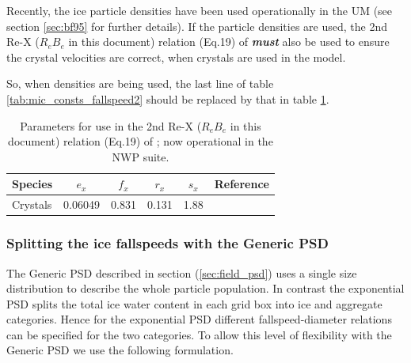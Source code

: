 \documentclass{UMDP_article}
\begin{document}
Recently, the \cite{Brown:Francis:1995} ice particle densities have been 
used operationally in the UM (see section \ref{sec:bf95} for further details). 
If the
\cite{Brown:Francis:1995} particle densities are used, the 2nd Re-X 
($R_e$\-$B_e$ in this document) relation (Eq.19) of \cite{Mitchell:1996}
\textit{\textbf{must}} also be used
to ensure the crystal velocities are correct, when crystals are used in the model.

So, when \cite{Brown:Francis:1995} densities are being used, the
last line of table \ref{tab:mic_consts_fallspeed2} should be replaced by
that in table \ref{tab:mit_2nd_rex}.

\begin{table}[ht!]
\begin{center}
\begin{tabular}{lccccl}
\hline
Species   & {$e_x$} & {$f_x$} & {$r_x$} & {$s_x$} & Reference       \\
\hline
Crystals  &  0.06049 &  0.831  & 0.131   & 1.88   &\cite{Mitchell:1996}\\
\hline
\end{tabular}
\end{center}
\caption{\label{tab:mit_2nd_rex} Parameters for use in the 2nd Re-X 
($R_e$\-$B_e$ in this document) relation (Eq.19) of \cite{Mitchell:1996}; 
now operational in the NWP suite.}
\end{table} 


\subsubsection{Splitting the ice fallspeeds with the Generic PSD}
\label{sec:split_ice_vt}

The Generic PSD described in section (\ref{sec:field_psd}) uses
a single size distribution to describe the whole particle
population. In contrast the exponential PSD splits the total
ice water content in each grid box into ice and aggregate
categories. Hence for the exponential PSD different fallspeed-diameter
relations can be specified for the two categories. To allow this
level of flexibility with the Generic PSD we use the following
formulation.
\end{document}
